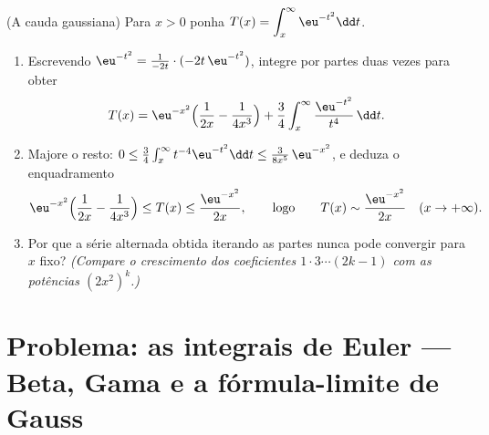 \begin{exercise}[$\star\star\star$]\label{exo:b2:integration:12}
(A cauda gaussiana) Para $x > 0$ ponha $T(x) = \displaystyle
\int_x^\infty \eu^{-t^2}\dd t$.
\begin{enumerate}
  \item Escrevendo $\eu^{-t^2} = \frac{1}{-2t}\cdot(-2t\,\eu^{-t^2})$,
        integre por partes duas vezes para obter
        \[
        T(x) = \eu^{-x^2}\Bigl(\frac{1}{2x} -
        \frac{1}{4x^3}\Bigr) +
        \frac34\int_x^\infty \frac{\eu^{-t^2}}{t^4}\,\dd t .
        \]
  \item Majore o resto: $0 \leq \frac34\int_x^\infty
        t^{-4}\eu^{-t^2}\dd t \leq \frac{3}{8x^5}\,\eu^{-x^2}$,
        e deduza o enquadramento
        \[
        \eu^{-x^2}\Bigl(\frac{1}{2x} - \frac{1}{4x^3}\Bigr)
        \leq T(x) \leq \frac{\eu^{-x^2}}{2x},
        \qquad\text{logo}\qquad
        T(x) \sim \frac{\eu^{-x^2}}{2x} \quad (x \to +\infty).
        \]
  \item Por que a série alternada  obtida iterando
        as partes nunca pode convergir para $x$ fixo? \emph{(Compare o
        crescimento dos coeficientes $1\cdot3\cdots(2k-1)$ com as
        potências $(2x^2)^k$.)}
\end{enumerate}
\end{exercise}

\section{Problema: as integrais de Euler --- Beta, Gama e a fórmula-limite
de Gauss}

